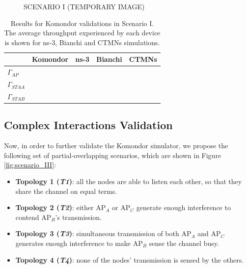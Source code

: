 \documentclass[a4paper]{article}
\begin{document}
	\begin{figure}[h!]
		\centering
		\caption{SCENARIO I (TEMPORARY IMAGE)}
		\label{fig:basic_scenario}
	\end{figure}	
	
	\begin{table}[h!]
		\centering
		\caption{Results for Komondor validations in Scenario I. The average throughput experienced by each device is shown for ns-3, Bianchi and CTMNs simulations.}
		\label{table:basic_scenario_results}
		\begin{tabular}{|l|c|c|c|c|}
			\hline
			& Komondor & ns-3 & Bianchi & CTMNs \\ \hline
			$\Gamma_{AP}$ &  &  & & \\ \hline
			$\Gamma_{STA A}$ &  &  & & \\ \hline
			$\Gamma_{STA B}$ & \multicolumn{1}{l|}{} & \multicolumn{1}{l|}{} & \multicolumn{1}{l|}{} & \multicolumn{1}{l|}{} \\ \hline
		\end{tabular}
	\end{table}

	\subsection{Complex Interactions Validation}
	\label{section:validations_complex_scenario}
	
	Now, in order to further validate the Komondor simulator, we propose the following set of partial-overlapping scenarios, which are shown in Figure \ref{fig:scenario_III}:
	\begin{itemize}
		\item \textbf{Topology 1 (\emph{T1})}: all the nodes are able to listen each other, so that they share the channel on equal terms.
		\item \textbf{Topology 2 (\emph{T2})}: either $\text{AP}_A$ or $\text{AP}_C$ generate enough interference to contend $\text{AP}_B$'s transmission.
		\item \textbf{Topology 3 (\emph{T3})}: simultaneous transmission of both $\text{AP}_A$ and $\text{AP}_C$ generates enough interference to make $\text{AP}_B$ sense the channel busy.
		\item \textbf{Topology 4 (\emph{T4})}: none of the nodes' transmission is sensed by the others.
	\end{itemize}
	
\end{document}
